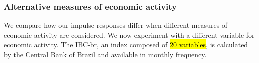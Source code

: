 \subsubsection{Alternative measures of economic activity}
We compare how our impulse responses differ when different measures of economic activity are considered.
We now experiment with a different variable for economic activity. The IBC-br, an index composed of \hl{20 variables}, is calculated by the Central Bank of Brazil and available in monthly frequency.
